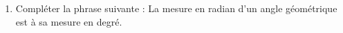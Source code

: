 \documentclass[12pt]{article}
\begin{document}
\begin{enumerate}
\begin{tabular}{m{7cm}m{3cm}}
\begin{tikzpicture}[line cap=round,line join=round,>=triangle 45,x=1.0cm,y=1.0cm,scale=1.5]
          \end{tikzpicture}
        \end{tabular}
      \item Compléter la phrase suivante : \newline
        La mesure en radian d'un angle géométrique est \makebox[3cm]{ \dotfill} à sa mesure en degré. 
    \end{enumerate}

    
\end{document}
